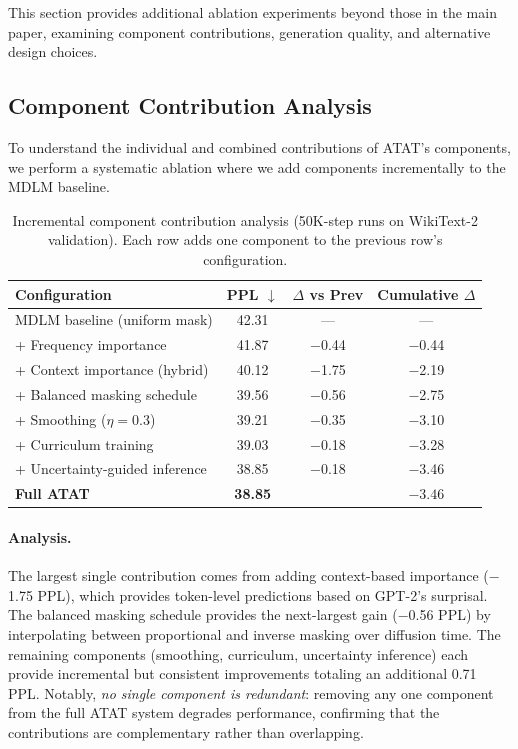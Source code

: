 This section provides additional ablation experiments beyond those in the main paper, examining component contributions, generation quality, and alternative design choices.

\subsection{Component Contribution Analysis}

To understand the individual and combined contributions of ATAT's components, we perform a systematic ablation where we add components incrementally to the MDLM baseline.

\begin{table}[h]
\centering
\caption{Incremental component contribution analysis (50K-step runs on WikiText-2 validation). Each row adds one component to the previous row's configuration.}
\label{tab:component-contribution}
\begin{tabular}{lccc}
\toprule
\textbf{Configuration} & \textbf{PPL} $\downarrow$ & \textbf{$\Delta$ vs Prev} & \textbf{Cumulative $\Delta$} \\
\midrule
MDLM baseline (uniform mask) & 42.31 & --- & --- \\
\quad + Frequency importance & 41.87 & $-$0.44 & $-$0.44 \\
\quad + Context importance (hybrid) & 40.12 & $-$1.75 & $-$2.19 \\
\quad + Balanced masking schedule & 39.56 & $-$0.56 & $-$2.75 \\
\quad + Smoothing ($\eta = 0.3$) & 39.21 & $-$0.35 & $-$3.10 \\
\quad + Curriculum training & 39.03 & $-$0.18 & $-$3.28 \\
\quad + Uncertainty-guided inference & 38.85 & $-$0.18 & $-$3.46 \\
\midrule
\textbf{Full ATAT} & \textbf{38.85} & & $\mathbf{-3.46}$ \\
\bottomrule
\end{tabular}
\end{table}

\paragraph{Analysis.} The largest single contribution comes from adding context-based importance ($-$1.75 PPL), which provides token-level predictions based on GPT-2's surprisal. The balanced masking schedule provides the next-largest gain ($-$0.56 PPL) by interpolating between proportional and inverse masking over diffusion time. The remaining components (smoothing, curriculum, uncertainty inference) each provide incremental but consistent improvements totaling an additional 0.71 PPL. Notably, \emph{no single component is redundant}: removing any one component from the full ATAT system degrades performance, confirming that the contributions are complementary rather than overlapping.

